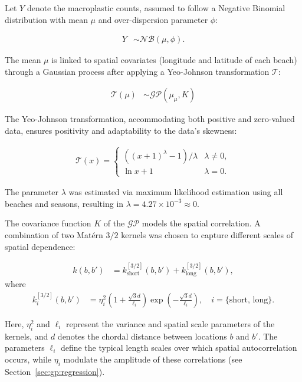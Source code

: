 Let $Y$ denote the macroplastic counts, assumed to follow a Negative Binomial distribution with mean $\mu$ and over-dispersion parameter $\phi$:

\begin{align}
    Y &\sim \mathcal{NB} (\mu, \phi).
\end{align}

The mean $\mu$ is linked to spatial covariates (longitude and latitude of each beach) through a Gaussian process after applying a Yeo-Johnson transformation \cite{yeo_new_2000} $\mathcal{T}$:

\begin{align}
    \mathcal{T}(\mu) &\sim \mathcal{GP}(\mu_{\mu}, K)
\end{align}

The Yeo-Johnson transformation, accommodating both positive and zero-valued data, ensures positivity and adaptability to the data's skewness:

\begin{align}
    \mathcal{T}(x) = \begin{cases}
      ((x+1)^{\lambda} - 1) / \lambda  & \lambda \neq 0,\\
      \ln x + 1 & \lambda = 0.
\end{cases}    
\end{align}

The parameter $\lambda$ was estimated via maximum likelihood estimation using all beaches and seasons, resulting in $\lambda = 4.27 \times 10^{-3} \approx 0$.

The covariance function $K$ of the $\mathcal{GP}$ models the spatial correlation. A combination of two Matérn $3/2$ kernels \cite{rasmussen_gaussian_2006} was chosen to capture different scales of spatial dependence:

\begin{align}
    k(b,b') &= k_{\text{short}}^{\left[3/2\right]}(b, b') + k_{\text{long}}^{\left[3/2\right]}(b, b'),
\end{align} where 
\begin{align}
    k_i^{\left[3/2\right]}(b, b') &= \eta_i^2 \left(1 +  \frac{\sqrt{3}d}{\ell_i} \right) \exp \left(- \frac{\sqrt{3}d}{\ell_i} \right), \quad i=\{\text{short, long}\}.
\end{align}

Here, $\eta_i^2$ and $\ell_i$ represent the variance and spatial scale parameters of the kernels, and $d$ denotes the chordal distance \cite{jeong_spherical_2017} between locations $b$ and $b'$. The parameters $\ell_i$ define the typical length scales over which spatial autocorrelation occurs, while $\eta_i$ modulate the amplitude of these correlations (see Section~\ref{sec:gp:regression}).

